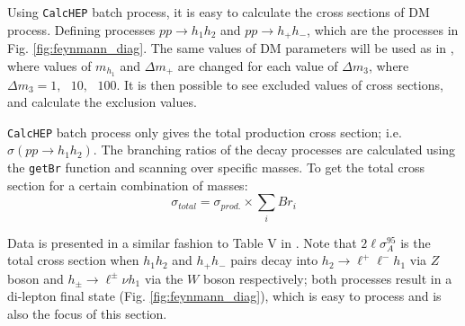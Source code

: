 \documentclass[12pt]{article}
\begin{document}
Using \verb|CalcHEP| batch process, it is easy to calculate the cross sections of DM process. Defining processes $pp\rightarrow h_1h_2$ and $pp \rightarrow h_+h_-$, which are the processes in Fig. \ref{fig:feynmann_diag}. The same values of DM parameters will be used as in \cite{Belyaev_2022}, where values of $m_{h_1}$ and $\Delta m_+$ are changed for each value of $\Delta m_3$, where $\Delta m_3 = 1, \text{ }10,\text{ } 100$. It is then possible to see excluded values of cross sections, and calculate the exclusion values.

\verb|CalcHEP| batch process only gives the total production cross section; i.e. $\sigma(pp\rightarrow h_1 h_2)$. The branching ratios of the decay processes are calculated using the \verb|getBr| function and scanning over specific masses. To get the total cross section for a certain combination of masses:
\begin{equation}
    \sigma_{total} = \sigma_{prod.} \times \sum_i Br_i
\end{equation}

Data is presented in a similar fashion to Table V in \cite{Belyaev_2022}. Note that $2 \ell \sigma_{A}^{95}$ is the total cross section when $h_1 h_2$ and $h_+h_-$ pairs decay into $h_2 \rightarrow \ell^+\ell^-h_1$ via $Z$ boson and $h_\pm \rightarrow \ell^\pm \nu h_1$ via the $W$ boson respectively; both processes result in a di-lepton final state (Fig. \ref{fig:feynmann_diag}), which is easy to process and is also the focus of this section.
\end{document}

